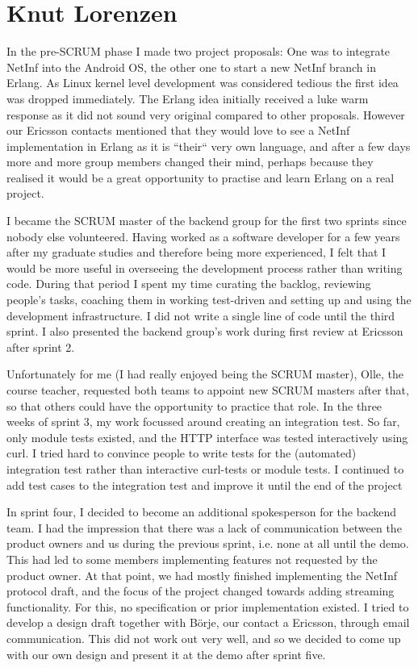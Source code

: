 \section{Knut Lorenzen}

In the pre-SCRUM phase I made two project proposals: One was to integrate NetInf into the Android OS, the other one to start a new NetInf branch in Erlang. As Linux kernel level development was considered tedious the first idea was dropped immediately. The Erlang idea initially received a luke warm response as it did not sound very original compared to other proposals. However our Ericsson contacts mentioned that they would love to see a NetInf implementation in Erlang as it is ``their`` very own language, and after a few days more and more group members changed their mind, perhaps because they realised it would be a great opportunity to practise and learn Erlang on a real project.

I became the SCRUM master of the backend group for the first two sprints since nobody else volunteered. Having worked as a software developer for a few years after my graduate studies and therefore being more experienced, I felt that I would be more useful in overseeing the development process rather than writing code. During that period I spent my time curating the backlog, reviewing people's tasks, coaching them in working test-driven and setting up and using the development infrastructure. I did not write a single line of code until the third sprint. I also presented the backend group's work during first review at Ericsson after sprint 2.

Unfortunately for me (I had really enjoyed being the SCRUM master), Olle, the course teacher, requested both teams to appoint new SCRUM masters after that, so that others could have the opportunity to practice that role. In the three weeks of sprint 3, my work focussed around creating an integration test. So far, only module tests existed, and the HTTP interface was tested interactively using curl. I tried hard to convince people to write tests for the (automated) integration test rather than interactive curl-tests or module tests. I continued to add test cases to the integration test and improve it until the end of the project

In sprint four, I decided to become an additional spokesperson for the backend team. I had the impression that there was a lack of communication between the product owners and us during the previous sprint, i.e. none at all until the demo. This had led to some members implementing features not requested by the product owner. At that point, we had mostly finished implementing the NetInf protocol draft, and the focus of the project changed towards adding streaming functionality. For this, no specification or prior implementation existed. I tried to develop a design draft together with B\"orje, our contact a Ericsson, through email communication. This did not work out very well, and so we decided to come up with our own design and present it at the demo after sprint five.
